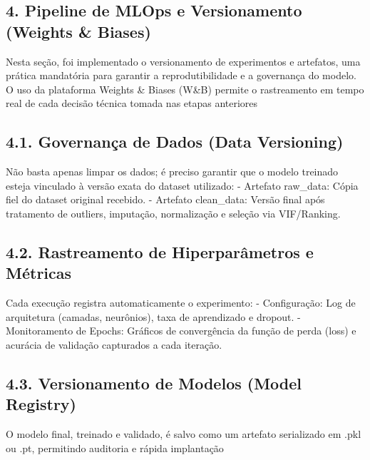 \documentclass[11pt]{article}
\begin{document}
    \subsection{4. Pipeline de MLOps e Versionamento (Weights \&
Biases)}\label{pipeline-de-mlops-e-versionamento-weights-biases}

Nesta seção, foi implementado o versionamento de experimentos e
artefatos, uma prática mandatória para garantir a reprodutibilidade e a
governança do modelo. O uso da plataforma Weights \& Biases (W\&B)
permite o rastreamento em tempo real de cada decisão técnica tomada nas
etapas anteriores

\subsection{4.1. Governança de Dados (Data
Versioning)}\label{governanuxe7a-de-dados-data-versioning}

Não basta apenas limpar os dados; é preciso garantir que o modelo
treinado esteja vinculado à versão exata do dataset utilizado: -
Artefato raw\_data: Cópia fiel do dataset original recebido. - Artefato
clean\_data: Versão final após tratamento de outliers, imputação,
normalização e seleção via VIF/Ranking.

\subsection{4.2. Rastreamento de Hiperparâmetros e
Métricas}\label{rastreamento-de-hiperparuxe2metros-e-muxe9tricas}

Cada execução registra automaticamente o experimento: - Configuração:
Log de arquitetura (camadas, neurônios), taxa de aprendizado e dropout.
- Monitoramento de Epochs: Gráficos de convergência da função de perda
(loss) e acurácia de validação capturados a cada iteração.

\subsection{4.3. Versionamento de Modelos (Model
Registry)}\label{versionamento-de-modelos-model-registry}

O modelo final, treinado e validado, é salvo como um artefato
serializado em .pkl ou .pt, permitindo auditoria e rápida implantação
\end{document}
